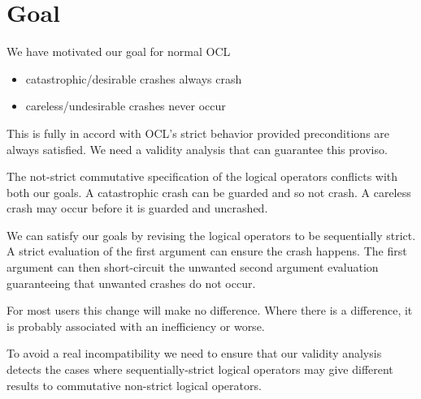\documentclass[
]{ceurart}
\begin{document}
 
\section{Goal}\label{Goal}

We have motivated our goal for normal OCL
\begin{itemize}
	\item catastrophic/desirable crashes always crash
	\item careless/undesirable crashes never occur
\end{itemize}

This is fully in accord with OCL's strict behavior provided preconditions are always satisfied. We need a validity analysis that can guarantee this proviso.

The not-strict commutative specification of the logical operators conflicts with both our goals. A catastrophic crash can be guarded and so not crash. A careless crash may occur before it is guarded and uncrashed.

We can satisfy our goals by revising the logical operators to be sequentially strict. A strict evaluation of the first argument can ensure the crash happens. The first argument can then short-circuit the unwanted second argument evaluation guaranteeing that unwanted crashes do not occur.

For most users this change will make no difference. Where there is a difference, it is probably associated with an inefficiency or worse.

To avoid a real incompatibility we need to ensure that our validity analysis detects the cases where sequentially-strict logical operators may give different results to commutative non-strict logical operators.
 

\end{document}
